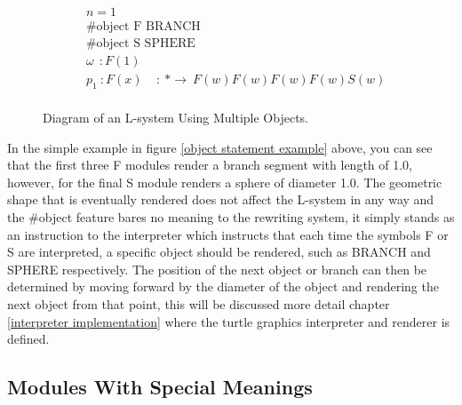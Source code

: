 \begin{flushleft}
\vspace{5mm}

\begin{equation} \label{object statement example}
\begin{aligned}
	&n=1 \\
	&\textrm{\#object F BRANCH}\\
	&\textrm{\#object S SPHERE}\\
	&\omega~~ : F(1)\\
	&p_1~ :  F(x)~~~~~ :~ * \rightarrow~ F(w)F(w)F(w)F(w)S(w)\\
\end{aligned}
\end{equation}

\begin{figure}[htbp]
	{\centering
		\vspace{7px}
		\setlength{\fboxrule}{1pt}
		\caption{Diagram of an L-system Using Multiple Objects.}
	}
\end{figure}
\FloatBarrier

\vspace{5mm}

In the simple example in figure \ref{object statement example} above, you can see that the first three F modules render a branch segment with length of 1.0, however, for the final S module renders a sphere of diameter 1.0. The geometric shape that is eventually rendered does not affect the L-system in any way and the \#object feature bares no meaning to the rewriting system, it simply stands as an instruction to the interpreter which instructs that each time the symbols F or S are interpreted, a specific object should be rendered, such as BRANCH and SPHERE respectively. The position of the next object or branch can then be determined by moving forward by the diameter of the object and rendering the next object from that point, this will be discussed more detail chapter \ref{interpreter implementation} where the turtle graphics interpreter and renderer is defined.


\end{flushleft}

\subsection{Modules With Special Meanings}

